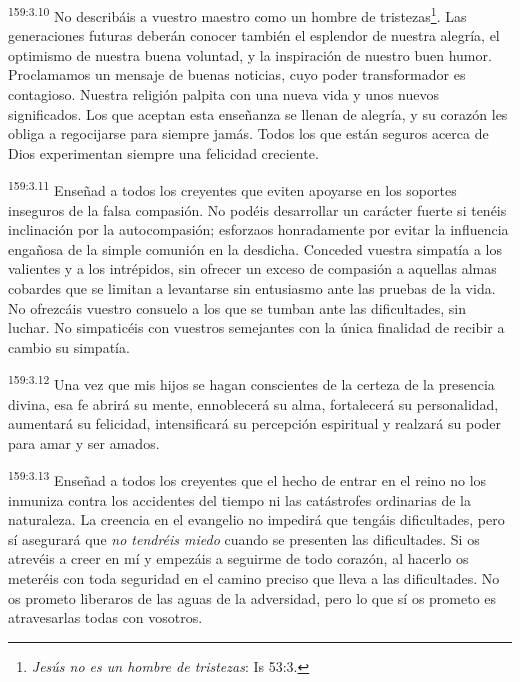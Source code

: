 \par
\textsuperscript{159:3.10} No describáis a vuestro maestro como un hombre de tristezas\footnote{\textit{Jesús no es un hombre de tristezas}: Is 53:3.}. Las generaciones futuras deberán conocer también el esplendor de nuestra alegría, el optimismo de nuestra buena voluntad, y la inspiración de nuestro buen humor. Proclamamos un mensaje de buenas noticias, cuyo poder transformador es contagioso. Nuestra religión palpita con una nueva vida y unos nuevos significados. Los que aceptan esta enseñanza se llenan de alegría, y su corazón les obliga a regocijarse para siempre jamás. Todos los que están seguros acerca de Dios experimentan siempre una felicidad creciente.

\par
\textsuperscript{159:3.11} Enseñad a todos los creyentes que eviten apoyarse en los soportes inseguros de la falsa compasión. No podéis desarrollar un carácter fuerte si tenéis inclinación por la autocompasión; esforzaos honradamente por evitar la influencia engañosa de la simple comunión en la desdicha. Conceded vuestra simpatía a los valientes y a los intrépidos, sin ofrecer un exceso de compasión a aquellas almas cobardes que se limitan a levantarse sin entusiasmo ante las pruebas de la vida. No ofrezcáis vuestro consuelo a los que se tumban ante las dificultades, sin luchar. No simpaticéis con vuestros semejantes con la única finalidad de recibir a cambio su simpatía.

\par
\textsuperscript{159:3.12} Una vez que mis hijos se hagan conscientes de la certeza de la presencia divina, esa fe abrirá su mente, ennoblecerá su alma, fortalecerá su personalidad, aumentará su felicidad, intensificará su percepción espiritual y realzará su poder para amar y ser amados.

\par
\textsuperscript{159:3.13} Enseñad a todos los creyentes que el hecho de entrar en el reino no los inmuniza contra los accidentes del tiempo ni las catástrofes ordinarias de la naturaleza. La creencia en el evangelio no impedirá que tengáis dificultades, pero sí asegurará que \textit{no tendréis miedo} cuando se presenten las dificultades. Si os atrevéis a creer en mí y empezáis a seguirme de todo corazón, al hacerlo os meteréis con toda seguridad en el camino preciso que lleva a las dificultades. No os prometo liberaros de las aguas de la adversidad, pero lo que sí os prometo es atravesarlas todas con vosotros.

